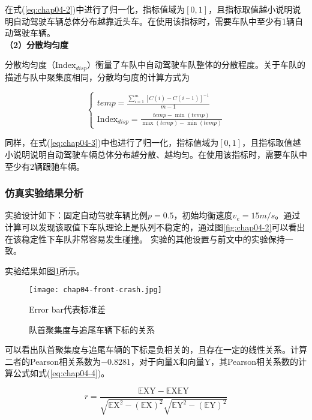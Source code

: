 在式(\ref{eq:chap04-2})中进行了归一化，指标值域为$[0,1]$，且指标取值越小说明说明自动驾驶车辆总体分布越靠近头车。在使用该指标时，需要车队中至少有1辆自动驾驶车辆。 \\

\noindent \textbf{（2）分散均匀度}

分散均匀度（$\mathrm{Index}_{disp}$）衡量了车队中自动驾驶车队整体的分散程度。关于车队的描述与队中聚集度相同，分散均匀度的计算方式为

\begin{equation}
    \begin{cases}
      temp = \frac{\sum_{i=1}^m [C(i)-C(i-1)]^{-1}}{m-1} \\
      \mathrm{Index}_{disp} = \frac{temp - \min(temp)}{\max(temp) - \min(temp)}
    \end{cases}
    \label{eq:chap04-3}
\end{equation}

同样，在式(\ref{eq:chap04-3})中也进行了归一化，指标值域为$[0,1]$，且指标取值越小说明说明自动驾驶车辆总体分布越分散、越均匀。在使用该指标时，需要车队中至少有2辆跟驰车辆。

\subsubsection{仿真实验结果分析}

实验设计如下：固定自动驾驶车辆比例$p=0.5$，初始均衡速度$v_e = 15m/s$。通过计算可以发现该取值下车队理论上是队列不稳定的，通过图\ref{fig:chap04-2}可以看出在该稳定性下车队非常容易发生碰撞。
实验的其他设置与前文中的实验保持一致。

实验结果如图\ref{fig:chap04-5}所示。

\begin{figure}
    \centering
    \texttt{[image: chap04-front-crash.jpg]}
    \caption*{Error bar代表标准差}
    \caption{队首聚集度与追尾车辆下标的关系}
    \label{fig:chap04-5}
\end{figure} 

可以看出队首聚集度与追尾车辆的下标是负相关的，且存在一定的线性关系。计算二者的Pearson相关系数为$-0.8281$，对于向量$\mathrm{X}$和向量$\mathrm{Y}$，其Pearson相关系数的计算公式如式(\ref{eq:chap04-4})。

\begin{equation}
    r = \frac{\mathbb{E}\mathrm{XY}-\mathbb{E}\mathrm{X}\mathbb{E}\mathrm{Y}}{\sqrt{\mathbb{E}\mathrm{X^2}-(\mathbb{E}\mathrm{X})^2}\sqrt{\mathbb{E}\mathrm{Y^2}-(\mathbb{E}\mathrm{Y})^2}}
    \label{eq:chap04-4}
\end{equation}

